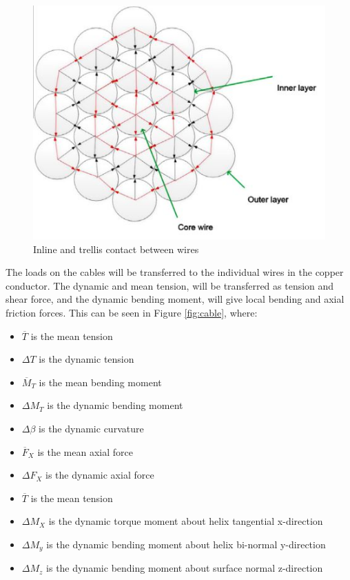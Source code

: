   \begin{figure}[H]
\centering
\includegraphics[scale=0.9]{figures/cross}
\caption[$\; \:$Inline and trellis contact between wires]{Inline and trellis contact between wires \cite{Nasution2013} }
 \label{fig:cross}
\end{figure}

\noindent The loads on the cables will be transferred to the individual wires in the copper conductor. The dynamic and mean tension, will be transferred as tension and shear force, and the dynamic bending moment, will give local bending and axial friction forces. This can be seen in Figure \ref{fig:cable}, where:
\begin{itemize}
    \item $\overline T$ is the mean tension
    \item $\Delta T$ is the dynamic tension
    \item $\overline M_T$ is the mean bending moment
    \item $\Delta M_T$ is the dynamic bending moment
    \item $\Delta \beta$ is the dynamic curvature
    \item $\overline F_X$ is the mean axial force
    \item $\Delta F_X$ is the dynamic axial force
    \item $\overline T$ is the mean tension
    \item $\Delta M_X$ is the dynamic torque moment about helix tangential x-direction
    \item $\Delta M_y$ is the dynamic bending moment about helix bi-normal y-direction
    \item $\Delta M_z$ is the dynamic bending moment about surface normal z-direction
\end{itemize}


